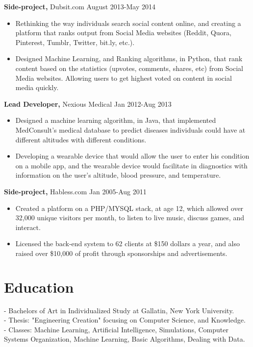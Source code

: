 \documentclass[margin]{res}
\begin{document}
\begin{resume}
{\bf Side-project,} Dubsit.com \hfill August 2013-May 2014
\begin{itemize} \itemsep -2pt 
\item Rethinking the way individuals search social content online, and creating a platform that ranks output from Social Media websites (Reddit, Quora, Pinterest, Tumblr, Twitter, bit.ly, etc.).
\item Designed Machine Learning, and Ranking algorithms, in Python, that rank content based on the statistics (upvotes, comments, shares, etc) from Social Media websites. Allowing users to get highest voted on content in social media quickly.
\end{itemize}

 {\bf Lead Developer,} Nexious Medical \hfill Jan 2012-Aug 2013
 \begin{itemize} \itemsep -2pt
 \item Designed a machine learning algorithm, in Java, that implemented MedConsult's medical database to predict diseases individuals could have at different altitudes with different conditions.
 \item Developing a wearable device that would allow the user to enter his condition on a mobile app, and the wearable device would facilitate in diagnostics with information on the user's altitude, blood pressure, and temperature.
 \end{itemize}

{\bf Side-project,} Habless.com \hfill Jan 2005-Aug 2011
\begin{itemize} \itemsep -2pt 
\item Created a platform on a PHP/MYSQL stack, at age 12, which allowed over 32,000
unique visitors per month, to listen to live music, discuss games, and interact.
\item Licensed the back-end system to 62 clients at \$150 dollars a year, and also raised over \$10,000 of profit through sponsorships and advertisements.
\end{itemize}

\section{Education} 
- Bachelors of Art in Individualized Study at Gallatin, New York University. \\
- Thesis: "Engineering Creation" focusing on Computer Science, and Knowledge. \\
- Classes: Machine Learning, Artificial Intelligence, Simulations, Computer Systems Organization, Machine Learning, Basic Algorithms, Dealing with Data.


\end{resume}
\end{document}
